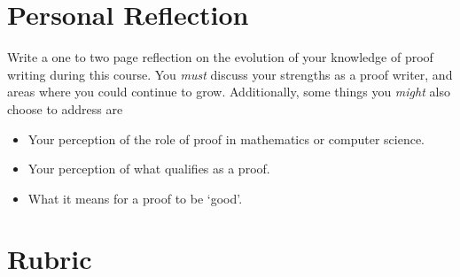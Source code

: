 \documentclass[12pt]{article}
\begin{document}
\section{Personal Reflection}
Write a one to two page reflection on the evolution of your knowledge of proof writing during this course. You \emph{must} discuss your strengths as a proof writer, and areas where you could continue to grow. Additionally, some things you \emph{might} also choose to address are 
\begin{itemize}
\item Your perception of the role of proof in mathematics or computer science.
\item Your perception of what qualifies as a proof.
\item What it means for a proof to be `good'.
\end{itemize}

\section{Rubric}
\end{document}
